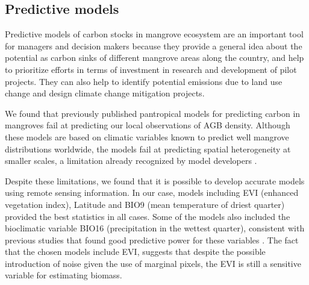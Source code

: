 \documentclass[review, authoryear]{elsarticle}   	%
\begin{document}
\subsection{Predictive models}
Predictive models of carbon stocks in mangrove ecosystem are an important tool for managers and decision makers because they provide a general idea about the potential as carbon sinks of different mangrove areas along the country, and help to prioritize efforts in terms of investment in research and development of pilot projects. They can also help to identify potential emissions due to land use change and design climate change mitigation projects. 

We found that previously published pantropical models for predicting carbon in mangroves fail at predicting our local observations of AGB density. Although these models are based on climatic variables known to predict well mangrove distributions worldwide, the models fail at predicting spatial heterogeneity at smaller scales, a limitation already recognized by model developers  \citep{CONL:CONL12060}.


Despite these limitations, we found that it is possible to develop accurate models using remote sensing information. In our case, models including EVI (enhanced vegetation index), Latitude and BIO9 (mean temperature of driest quarter) provided the best statistics in all cases. Some of the models also included the bioclimatic variable BIO16 (precipitation in the wettest quarter), consistent with previous studies that found good predictive power for these variables \citep{CONL:CONL12060, Herz1999, Anaya2009}. The fact that the chosen models include EVI, suggests that despite the possible introduction of noise given the use of marginal pixels, the EVI is still a sensitive variable for estimating biomass.

\end{document}
